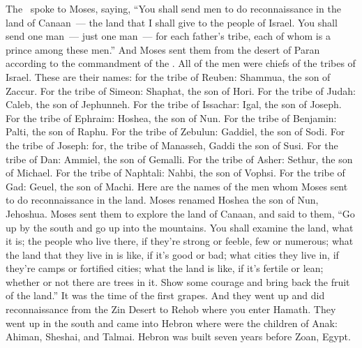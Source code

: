 
\begin{inparaenum}
   The \lord\ spoke to Moses, saying,%
   ``You shall send men to do reconnaissance in the land of Canaan~--- the land that I shall give to the people of Israel. You shall send one man~--- just one man~--- for each father's tribe, each of whom is a prince among these men.''%
   And Moses sent them from the desert of Paran according to the commandment of the \lord. All of the men were chiefs of the tribes of Israel.%
   These are their names: for the tribe of Reuben: Shammua, the son of Zaccur.%
   For the tribe of Simeon: Shaphat, the son of Hori.%
   For the tribe of Judah: Caleb, the son of Jephunneh.%
   For the tribe of Issachar: Igal, the son of Joseph.%
   For the tribe of Ephraim: Hoshea, the son of Nun.%
   For the tribe of Benjamin: Palti, the son of Raphu.%
   For the tribe of Zebulun: Gaddiel, the son of Sodi.%
   For the tribe of Joseph: for, the tribe of Manasseh, Gaddi the son of Susi.%
   For the tribe of Dan: Ammiel, the son of Gemalli.%
   For the tribe of Asher: Sethur, the son of Michael.%
   For the tribe of Naphtali: Nahbi, the son of Vophsi.%
   For the tribe of Gad: Geuel, the son of Machi.%
   Here are the names of the men whom Moses sent to do reconnaissance in the land. Moses renamed Hoshea the son of Nun, Jehoshua.%
   Moses sent them to explore the land of Canaan, and said to them, ``Go up by the south and go up into the mountains.%
   You shall examine the land, what it is; the people who live there, if they're strong or feeble, few or numerous;%
   what the land that they live in is like, if it's good or bad; what cities they live in, if they're camps or fortified cities;%
   what the land is like, if it's fertile or lean; whether or not there are trees in it. Show some courage and bring back the fruit of the land.'' It was the time of the first grapes.%
   And they went up and did reconnaissance from the Zin Desert to Rehob where you enter Hamath.%
   They went up in the south and came into Hebron where were the children of Anak: Ahiman, Sheshai, and Talmai. Hebron was built seven years before Zoan, Egypt.%

\end{inparaenum}

